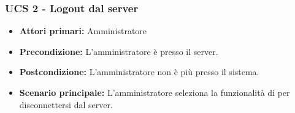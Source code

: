 
\subsubsection{UCS 2 - Logout dal server}

\begin{itemize}
\item \textbf{Attori primari:} Amministratore 
\item \textbf{Precondizione:} L'amministratore è  presso il server.
\item \textbf{Postcondizione:} L'amministratore non è più  presso il sistema.
\item \textbf{Scenario principale:} L'amministratore seleziona la funzionalità di  per disconnettersi dal server.
\end{itemize}
